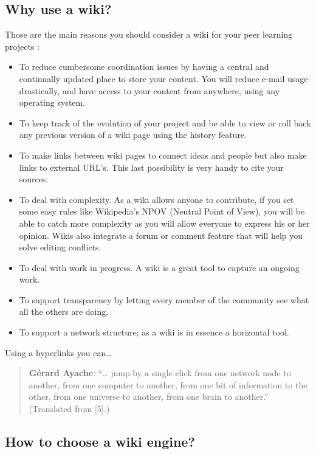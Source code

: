 \hypertarget{why-use-a-wiki}{%
\subsection{Why use a wiki?}\label{why-use-a-wiki}}

Those are the main reasons you should consider a wiki for your peer
learning projects :

\begin{itemize}
\tightlist
\item
  To reduce cumbersome coordination issues by having a central and
  continually updated place to store your content. You will reduce
  e-mail usage drastically, and have access to your content from
  anywhere, using any operating system.
\item
  To keep track of the evolution of your project and be able to view or
  roll back any previous version of a wiki page using the history
  feature.
\item
  To make links between wiki pages to connect ideas and people but also
  make links to external URL's. This last possibility is very handy to
  cite your sources.
\item
  To deal with complexity. As a wiki allows anyone to contribute, if you
  set some easy rules like Wikipedia's NPOV (Neutral Point of View), you
  will be able to catch more complexity as you will allow everyone to
  express his or her opinion. Wikis also integrate a forum or comment
  feature that will help you solve editing conflicts.
\item
  To deal with work in progress. A wiki is a great tool to capture an
  ongoing work.
\item
  To support transparency by letting every member of the community see
  what all the others are doing.
\item
  To support a network structure; as a wiki is in essence a horizontal
  tool.
\end{itemize}

Using a hyperlinks you can\ldots{}

\begin{quote}
\textbf{Gérard Ayache}: ``\ldots{} jump by a single click from one
network node to another, from one computer to another, from one bit of
information to the other, from one universe to another, from one brain
to another.''~ (Translated from {{[}5{]}}.)
\end{quote}

\hypertarget{how-to-choose-a-wiki-engine}{%
\subsection{How to choose a wiki
engine?}\label{how-to-choose-a-wiki-engine}}

